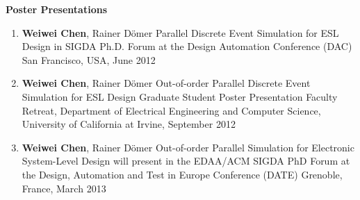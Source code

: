 \vspace{5mm}
{\textbf{\large Poster Presentations}}
\vspace{-2mm}
\begin{enumerate}
\item
	\mypub
	{\textbf{Weiwei Chen}, Rainer D\"{o}mer}
	{Parallel Discrete Event Simulation for ESL Design} 
	{in } 
	{SIGDA Ph.D. Forum at the Design Automation Conference (DAC)}
	{San Francisco, USA, June 2012}
	
\item	
	\mypub
	{\textbf{Weiwei Chen}, Rainer D\"{o}mer}
	{Out-of-order Parallel Discrete Event Simulation for ESL Design}
	{}
	{Graduate Student Poster Presentation}
	{Faculty Retreat, Department of Electrical Engineering and Computer Science, University of California at Irvine, September 2012}
	
\item	
	\mypub
	{\textbf{Weiwei Chen}, Rainer D\"{o}mer}
	{Out-of-order Parallel Simulation for Electronic System-Level Design}
	{will present in the }
	{EDAA/ACM SIGDA PhD Forum at the Design, Automation and Test in Europe Conference (DATE)}
	{Grenoble, France, March 2013}

\end{enumerate}




